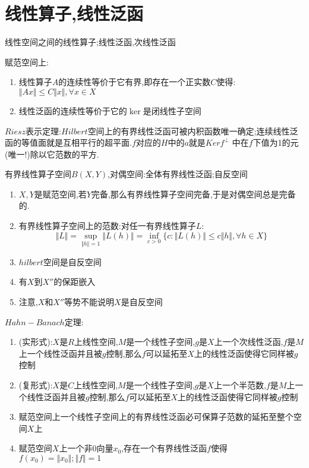 \section{线性算子,线性泛函}

线性空间之间的线性算子;线性泛函,次线性泛函

赋范空间上:
\begin{enumerate}
  \item 线性算子$A$的连续性等价于它有界,即存在一个正实数$C$使得:$\Vert Ax\Vert\le C\Vert x\Vert,\forall x\in X$
  \item 线性泛函的连续性等价于它的$\ker$是闭线性子空间
\end{enumerate}

$Riesz$表示定理:$Hilbert$空间上的有界线性泛函可被内积函数唯一确定;连续线性泛函的等值面就是互相平行的超平面.$f$对应的$H$中的$a$就是$Kerf^{\perp}$ 中在$f$下值为1的元(唯一!)除以它范数的平方.

有界线性算子空间$B(X,Y)$,对偶空间:全体有界线性泛函;自反空间
\begin{enumerate}
  \item $X,Y$是赋范空间,若$Y$完备,那么有界线性算子空间完备,于是对偶空间总是完备的.
  \item 有界线性算子空间上的范数:对任一有界线性算子$L$:$$\Vert L\Vert=\sup_{\Vert h\Vert=1}\Vert L(h)\Vert=
  \inf_{c>0}\{c:\Vert L(h)\Vert\le c\Vert h\Vert,\forall h\in X\}$$
  \item $hilbert$空间是自反空间
  \item 有$X$到$X''$的保距嵌入
  \item 注意,$X$和$X''$等势不能说明$X$是自反空间
\end{enumerate}

$Hahn-Banach$定理:
\begin{enumerate}
  \item (实形式):$X$是$R$上线性空间,$M$是一个线性子空间,$g$是$X$上一个次线性泛函,$f$是$M$上一个线性泛函并且被$g$控制,那么$f$可以延拓至$X$上的线性泛函使得它同样被$g$控制
  \item (复形式):$X$是$C$上线性空间,$M$是一个线性子空间,$g$是$X$上一个半范数,$f$是$M$上一个线性泛函并且被$g$控制,那么$f$可以延拓至$X$上的线性泛函使得它同样被$g$控制
  \item 赋范空间上一个线性子空间上的有界线性泛函必可保算子范数的延拓至整个空间$X$上
  \item 赋范空间$X$上一个非0向量$x_0$,存在一个有界线性泛函$f$使得$f(x_0)=\Vert x_0\Vert;\Vert f\Vert=1$
\end{enumerate}

